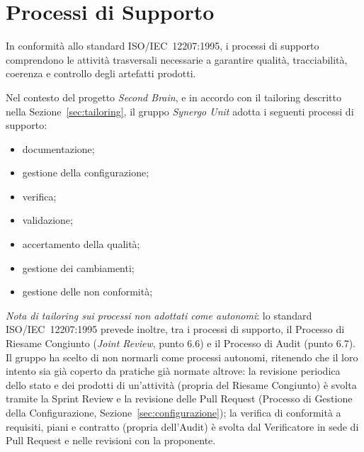 
\section{Processi di Supporto}
\label{sec:processi-supporto}

In conformità allo standard ISO/IEC~12207:1995, i processi di
supporto comprendono le attività trasversali necessarie a garantire qualità,
tracciabilità, coerenza e controllo degli artefatti prodotti.

Nel contesto del progetto \textit{Second Brain}, e in accordo con il tailoring
descritto nella Sezione~\ref{sec:tailoring}, il gruppo \textit{Synergo Unit} adotta
i seguenti processi di supporto:

\begin{itemize}
    \item documentazione;
    \item gestione della configurazione;
    \item verifica;
    \item validazione;
    \item accertamento della qualità;
    \item gestione dei cambiamenti;
    \item gestione delle non conformità;
\end{itemize}

\textit{Nota di tailoring sui processi non adottati come autonomi}: lo
standard ISO/IEC~12207:1995 prevede inoltre, tra i processi di supporto, il
Processo di Riesame Congiunto (\textit{Joint Review}, punto 6.6) e il
Processo di Audit (punto 6.7). Il gruppo ha scelto di non normarli come
processi autonomi, ritenendo che il loro intento sia già coperto da pratiche
già normate altrove: la revisione periodica dello stato e dei prodotti di
un'attività (propria del Riesame Congiunto) è svolta tramite la Sprint
Review e la revisione delle Pull Request (Processo di Gestione della
Configurazione, Sezione~\ref{sec:configurazione}); la verifica di conformità
a requisiti, piani e contratto (propria dell'Audit) è svolta dal
Verificatore in sede di Pull Request e nelle revisioni con la proponente.


